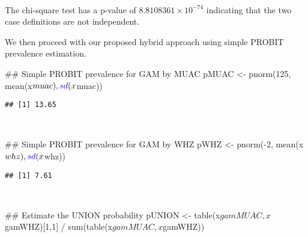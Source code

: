 \documentclass[12pt,a4paper]{article}
\newenvironment{Shaded}{}{}
\newcommand{\CommentTok}[1]{\textcolor[rgb]{0.00,0.50,0.00}{#1}}
\newcommand{\DecValTok}[1]{#1}
\newcommand{\KeywordTok}[1]{\textcolor[rgb]{0.00,0.00,1.00}{#1}}
\newcommand{\NormalTok}[1]{#1}
\newcommand{\OperatorTok}[1]{#1}
\newcommand{\StringTok}[1]{\textcolor[rgb]{0.00,0.50,0.50}{#1}}
\begin{document}
~

The chi-square test has a p-value of \ensuremath{8.8108361\times 10^{-74}} indicating that the two case definitions are not independent.

\newpage

We then proceed with our proposed hybrid approach using simple PROBIT prevalence estimation.

\begin{Shaded}
\begin{Highlighting}[]
\CommentTok{## Simple PROBIT prevalence for GAM by MUAC}
\NormalTok{pMUAC <-}\StringTok{ }\KeywordTok{pnorm}\NormalTok{(}\DecValTok{125}\NormalTok{, }\KeywordTok{mean}\NormalTok{(x}\OperatorTok{$}\NormalTok{muac), }\KeywordTok{sd}\NormalTok{(x}\OperatorTok{$}\NormalTok{muac))}
\end{Highlighting}
\end{Shaded}

\begin{verbatim}
## [1] 13.65
\end{verbatim}

~

\begin{Shaded}
\begin{Highlighting}[]
\CommentTok{## Simple PROBIT prevalence for GAM by WHZ}
\NormalTok{pWHZ <-}\StringTok{ }\KeywordTok{pnorm}\NormalTok{(}\OperatorTok{-}\DecValTok{2}\NormalTok{, }\KeywordTok{mean}\NormalTok{(x}\OperatorTok{$}\NormalTok{whz), }\KeywordTok{sd}\NormalTok{(x}\OperatorTok{$}\NormalTok{whz))}
\end{Highlighting}
\end{Shaded}

\begin{verbatim}
## [1] 7.61
\end{verbatim}

~

\begin{Shaded}
\begin{Highlighting}[]
\CommentTok{## Estimate the UNION probability}
\NormalTok{pUNION <-}\StringTok{ }\KeywordTok{table}\NormalTok{(x}\OperatorTok{$}\NormalTok{gamMUAC, x}\OperatorTok{$}\NormalTok{gamWHZ)[}\DecValTok{1}\NormalTok{,}\DecValTok{1}\NormalTok{] }\OperatorTok{/}\StringTok{ }\KeywordTok{sum}\NormalTok{(}\KeywordTok{table}\NormalTok{(x}\OperatorTok{$}\NormalTok{gamMUAC, x}\OperatorTok{$}\NormalTok{gamWHZ))}
\end{Highlighting}
\end{Shaded}
\end{document}
